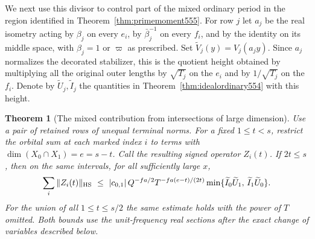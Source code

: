 \documentclass[a4paper,11pt]{article}
\newtheorem{theorem}[proposition]{Theorem}
\theoremstyle{definition}
\theoremstyle{remark}
\numberwithin{equation}{section}
\begin{document}
We next use this divisor to control part of the mixed
ordinary period in the region identified in
Theorem~\ref{thm:primemoment555}. For row \(j\) let \(a_j\) be
the real isometry acting by \(\beta_j\) on every \(e_i\), by
\(\bar\beta_j^{-1}\) on every \(f_i\), and by the identity
on its middle space, with \(\beta_j=1\) or \(\varpi\) as
prescribed. Set \(\widetilde V_j(y)=V_j(a_jy)\). Since \(a_j\)
normalizes the decorated stabilizer, this is the quotient
height obtained by multiplying all the original outer lengths
by \(\sqrt{T_j}\) on the \(e_i\) and by \(1/\sqrt{T_j}\) on
the \(f_i\). Denote by \(\widetilde U_j,\widetilde I_j\)
the quantities in Theorem~\ref{thm:idealordinary554} with
this height.

\begin{theorem}[The mixed contribution from intersections of large dimension]
\leavevmode\label{thm:mixedhalf556}
Use a pair of retained rows of unequal terminal norms. For
a fixed \(1\le t<s\), restrict the orbital sum at each marked
index \(i\) to terms with \(\dim(X_0\cap X_1)=e=s-t\).
Call the resulting signed operator \(Z_i(t)\). If \(2t\le s\), then
on the same intervals, for all sufficiently large \(x\),
\[
 \sum_i\|Z_i(t)\|_{\rm HS}
 \ \le\ |c_{0,1}|\,Q^{-fa/2}T^{-fa(e-t)/(2t)}
      \min\{\widetilde I_0\widetilde U_1,\,
                         \widetilde I_1\widetilde U_0\}.
\]
For the union of all \(1\le t\le s/2\) the same estimate holds
with the power of \(T\) omitted. Both bounds use the
unit-frequency real sections after the exact change of variables
described below.
\end{theorem}
\end{document}
